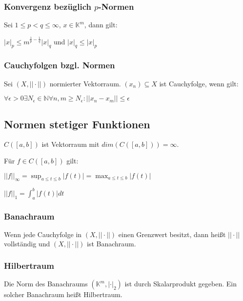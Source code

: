 \subsubsection*{Konvergenz bezüglich $p$-Normen}

Sei $1 \leq p < q \leq \infty$, $x \in \mathbb{K}^m$, dann gilt:

$|x|_p \leq m^{\frac{1}{p} - \frac{1}{q}} |x|_q$ und $|x|_q \leq |x|_p$

\subsubsection*{Cauchyfolgen bzgl. Normen}

Sei $(X, ||\cdot||)$ normierter Vektorraum. $(x_n) \subseteq X$ ist Cauchyfolge, wenn gilt:

$\forall \epsilon > 0 \exists N_\epsilon \in \mathbb{N} \forall n, m \geq N_\epsilon : ||x_n - x_m|| \leq \epsilon$

\subsection*{Normen stetiger Funktionen}

$C([a, b])$ ist Vektorraum mit $dim(C([a, b])) = \infty$.

Für $f \in C([a, b])$ gilt:

\begin{description}[leftmargin=!,labelwidth=15mm]
	\item[Supnorm] $||f||_\infty = \displaystyle\sup_{a\leq t \leq b} |f(t)| = \displaystyle\max_{a\leq t\leq b} |f(t)|$
	\item[1-Norm] $||f||_1 = \int_a^b |f(t)| dt$
\end{description}

\subsubsection*{Banachraum}

Wenn jede Cauchyfolge in $(X, ||\cdot||)$ einen Grenzwert besitzt, dann heißt $||\cdot||$ vollständig und $(X, ||\cdot||)$ ist Banachraum.

\subsubsection*{Hilbertraum}

Die Norm des Banachraums $(\mathbb{K}^m, |\cdot|_2)$ ist durch Skalarprodukt gegeben. Ein solcher Banachraum heißt Hilbertraum.

